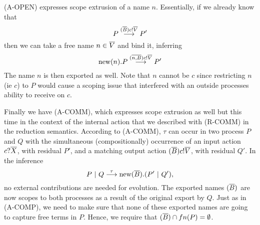 (A-OPEN) expresses scope extrusion of a name $n$.  Essentially, if we already know that 
\[
	P\overset{{({\overline{B}}){c}!{\overline{V}}}}{\longrightarrow} P'
\]
then we can take a free name $n\in \overline{V}$ and bind it, inferring
\[
	\text{new}({n}). P\overset{{({\overline{n,B}}){c}!{\overline{V}}}}{\longrightarrow} P'
\]
The name $n$ is then exported as well.
Note that $n$ cannot be $c$ since restricting $n$ (ie $c$) to $P$ would cause a scoping issue that interfered with an outside processes ability to receive on $c$.

Finally we have (A-COMM), which expresses scope extrusion as well but this time in the context of the internal action that we described with (R-COMM) in the reduction semantics.  
According to (A-COMM), $\tau$ can occur in two process $P$ and $Q$ with the simultaneous (compositionally) occurrence of an input action ${c}?{\overline{X}}$, with residual $P'$, and a matching output action $({\overline{B}}){c}!{\overline{V}}$, with residual $Q'$.  
In the inference
\[
	P\ |\  Q \overset{{\tau}}{\longrightarrow} \text{new}({\overline{B}}).(P'\ |\  Q'),
\]
no external contributions are needed for evolution.  The exported names $({\overline{B}})$ are now scopes to both processes as a result of the original export by $Q$.  Just as in (A-COMP), we need to make sure that none of these exported names are going to capture free terms in $P$.  Hence, we require that $({\overline{B}})\cap fn(P) = \emptyset$.

